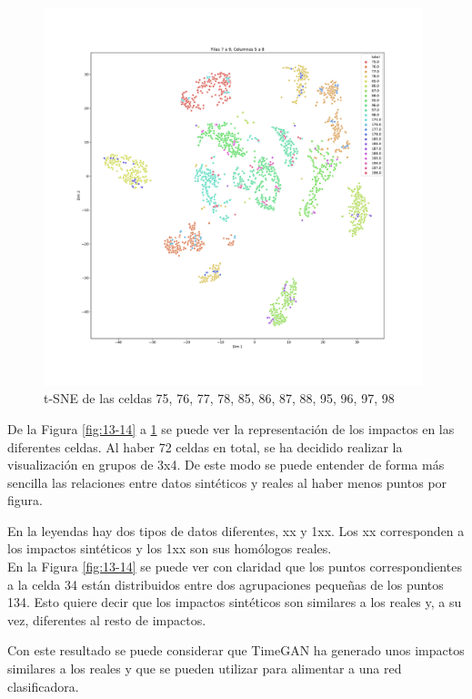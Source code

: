 \begin{figure}[H]
    \centering
    \includegraphics[width=110mm, angle=0]{4/Fotos/tsne_TimeGAN_79-58.pdf}
    \captionsetup{justification=centering,margin=1.25cm}
    \caption{t-SNE de las celdas 75, 76, 77, 78, 85, 86, 87, 88, 95, 96, 97, 98}
    \label{fig:79-58}
\end{figure}

De la Figura \ref{fig:13-14} a \ref{fig:79-58} se puede ver la representación de los impactos en las diferentes celdas. Al haber 72 celdas en total, se ha decidido realizar la visualización en grupos de 3x4. De este modo se puede entender de forma más sencilla las relaciones entre datos sintéticos y reales al haber menos puntos por figura.

En la leyendas hay dos tipos de datos diferentes, xx y 1xx. Los xx corresponden a los impactos sintéticos y los 1xx son sus homólogos reales.\\

En la Figura \ref{fig:13-14} se puede ver con claridad que los puntos correspondientes a la celda 34 están distribuidos entre dos agrupaciones pequeñas de los puntos 134. Esto quiere decir que los impactos sintéticos son similares a los reales y, a su vez, diferentes al resto de impactos.

Con este resultado se puede considerar que TimeGAN ha generado unos impactos similares a los reales y que se pueden utilizar para alimentar a una red clasificadora.

\clearpage


